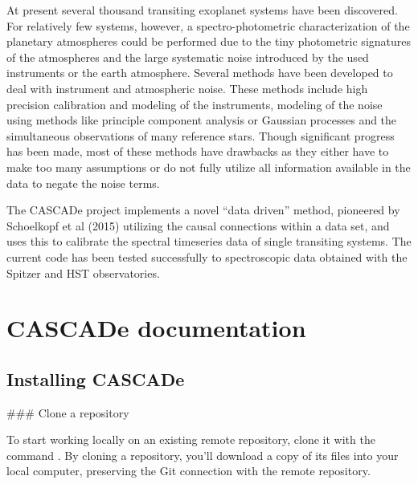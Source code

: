 \documentclass[a4paper,10pt,english]{sphinxmanual}
\begin{document}
        \clearpage
        \tableofcontents
        \listoffigures
        \listoftables
        \clearpage

        
\pagestyle{plain}
 
\pagestyle{normal}
\label{\detokenize{index::doc}}


At present several thousand transiting exoplanet systems have been discovered.
For relatively few systems, however, a spectro-photometric characterization of
the planetary atmospheres could be performed due to the tiny photometric signatures
of the atmospheres and the large systematic noise introduced by the used instruments
or the earth atmosphere. Several methods have been developed to deal with instrument
and atmospheric noise. These methods include high precision calibration and modeling
of the instruments, modeling of the noise using methods like principle component
analysis or Gaussian processes and the simultaneous observations of many reference
stars. Though significant progress has been made, most of these methods have drawbacks
as they either have to make too many assumptions or do not fully utilize all
information available in the data to negate the noise terms.

The CASCADe project implements a novel “data driven” method, pioneered by
Schoelkopf et al (2015) utilizing the causal connections within a data set,
and uses this to calibrate the spectral timeseries data of single transiting
systems. The current code has been tested successfully to spectroscopic data
obtained with the Spitzer and HST observatories.


\chapter{CASCADe documentation}
\label{\detokenize{index:cascade-documentation}}

\section{Installing CASCADe}
\label{\detokenize{install:installing-cascade}}\label{\detokenize{install::doc}}
\#\#\# Clone a repository

To start working locally on an existing remote repository,
clone it with the command .
By cloning a repository, you’ll download a copy of its
files into your local computer, preserving the Git
connection with the remote repository.
\end{document}
